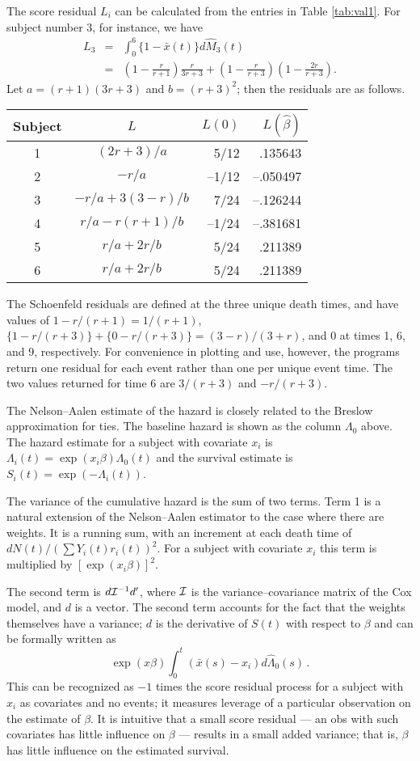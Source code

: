 \documentclass[11pt]{article}
\def\bhat{\hat \beta}        %
\def\Mhat{\widehat M}        %
\def\xbar{\bar x}
\def\imat{{\cal I}}
\def\Cvar{{\cal I}^{-1}}
\begin{document}
The score residual $L_i$ can be calculated from the entries in
 Table \ref{tab:val1}.
For subject number 3, for instance, we have
\begin{eqnarray*}
 L_3 &=&\int_0^6 \{1 - \xbar(t)\}  d\Mhat_3(t) \\
	&=& \left(1-\frac{r}{r+1}\right) \frac{r}{3r+3} + 
	\left(1-\frac{r}{r+3}\right) \left(1-\frac{2r}{r+3}\right) .
\end{eqnarray*}
Let $a=(r+1)(3r+3)$ and $b=(r+3)^2$; then the residuals are as follows.
\begin{center}
\begin{tabular}{c|crr}
Subject & $L$& $L(0)$ &$ L(\bhat)$ \\ \hline
1& $(2r+3)/a$& 5/12 & .135643 \\
2& $-r/a$& --1/12& --.050497 \\
3& $-r/a + 3(3-r)/b$& 7/24& --.126244 \\
4& $r/a - r(r+1)/b$& --1/24& --.381681\\
5& $r/a + 2r/b$& 5/24& .211389 \\
6& $r/a + 2r/b$& 5/24& .211389 
\end{tabular}
\end{center}

The Schoenfeld residuals are defined at the three unique death times, and
have values of $1-r/(r+1) = 1/(r+1)$, 
$\{1 -r/(r+3)\} + \{0- r/(r+3)\}= (3-r)/(3+r)$,
and 0 at times 1, 6, and 9, respectively.
For convenience in plotting and use, however, the programs return one
residual for each event rather than one per unique event time.
The two values returned for time 6 are $3/(r+3)$ and $-r/(r+3)$.

The Nelson--Aalen estimate of the hazard is closely related to the
Breslow approximation for ties.
The baseline hazard is shown as the column $\Lambda_0$ above. 
The hazard estimate for a subject with covariate $x_i$ is
$\Lambda_i(t) = \exp(x_i \beta) \Lambda_0(t)$ and the survival
estimate is $S_i(t)= \exp(-\Lambda_i(t))$.

    The variance of the cumulative hazard is the sum of two terms.  
Term 1 
is a natural extension of 
the Nelson--Aalen estimator to the case where there are
weights.  It is a running sum, with an increment at each death time of
$dN(t)/(\sum Y_i(t)r_i(t))^2$.
For a subject with covariate $x_i$ this term is multiplied by
$[\exp(x_i \beta)]^2$.

    The second term is $d\Cvar d'$, where $\imat$ is the 
variance--covariance matrix of the
Cox model, and $d$ is a vector.  
The second term accounts for the fact that the
weights themselves have a variance; 
$d$ is the derivative of $S(t)$ with respect to $\beta$
and can be formally written as
$$         \exp(x\beta) \int_0^t (\bar x(s) - x_i) d\hat\Lambda_0 (s)\,.
$$
This can be recognized as $-1$ times the score residual process
for a subject with $x_i$ as covariates and no events; it measures
leverage of a particular observation on the estimate of $\beta$.  It is
intuitive that a small score residual --- an obs with such 
covariates has little influence on $\beta$ --- results in a small added
variance; that is, $\beta$ has little influence on the estimated survival.  
\end{document}
